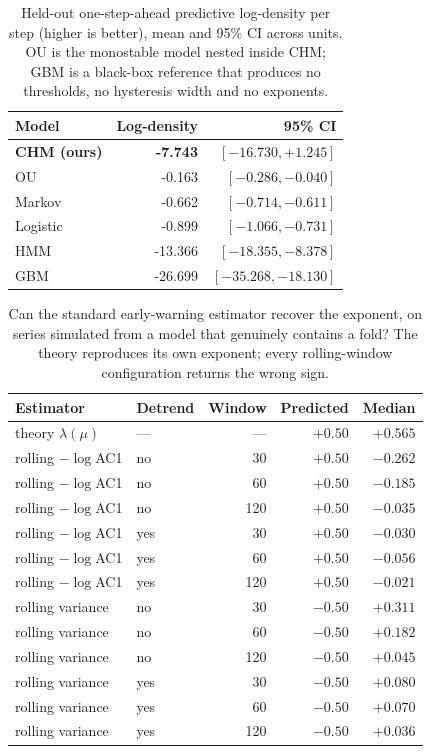 \begin{table}[t]
\caption{Held-out one-step-ahead predictive log-density per step (higher is better), mean and 95\% CI across units. OU is the monostable model nested inside CHM; GBM is a black-box reference that produces no thresholds, no hysteresis width and no exponents.}
\label{tab:comparison}
\centering
\begin{tabular}{@{}lrr@{}}
\toprule
Model & Log-density & 95\% CI \\
\midrule
\textbf{CHM (ours)} & \textbf{-7.743} & $[-16.730, +1.245]$ \\
OU & -0.163 & $[-0.286, -0.040]$ \\
Markov & -0.662 & $[-0.714, -0.611]$ \\
Logistic & -0.899 & $[-1.066, -0.731]$ \\
HMM & -13.366 & $[-18.355, -8.378]$ \\
GBM & -26.699 & $[-35.268, -18.130]$ \\
\bottomrule
\end{tabular}
\end{table}

\begin{table}[t]
\caption{Can the standard early-warning estimator recover the exponent, on series simulated from a model that genuinely contains a fold? The theory reproduces its own exponent; every rolling-window configuration returns the wrong sign.}
\label{tab:ewsval}
\centering
\begin{tabular}{@{}llrrr@{}}
\toprule
Estimator & Detrend & Window & Predicted & Median \\
\midrule
theory $\lambda(\mu)$ & --- & --- & $+0.50$ & $\mathbf{+0.565}$ \\
\midrule
rolling $-\log$AC1 & no & 30 & $+0.50$ & $-0.262$ \\
rolling $-\log$AC1 & no & 60 & $+0.50$ & $-0.185$ \\
rolling $-\log$AC1 & no & 120 & $+0.50$ & $-0.035$ \\
rolling $-\log$AC1 & yes & 30 & $+0.50$ & $-0.030$ \\
rolling $-\log$AC1 & yes & 60 & $+0.50$ & $-0.056$ \\
rolling $-\log$AC1 & yes & 120 & $+0.50$ & $-0.021$ \\
rolling variance & no & 30 & $-0.50$ & $+0.311$ \\
rolling variance & no & 60 & $-0.50$ & $+0.182$ \\
rolling variance & no & 120 & $-0.50$ & $+0.045$ \\
rolling variance & yes & 30 & $-0.50$ & $+0.080$ \\
rolling variance & yes & 60 & $-0.50$ & $+0.070$ \\
rolling variance & yes & 120 & $-0.50$ & $+0.036$ \\
\bottomrule
\end{tabular}
\end{table}

